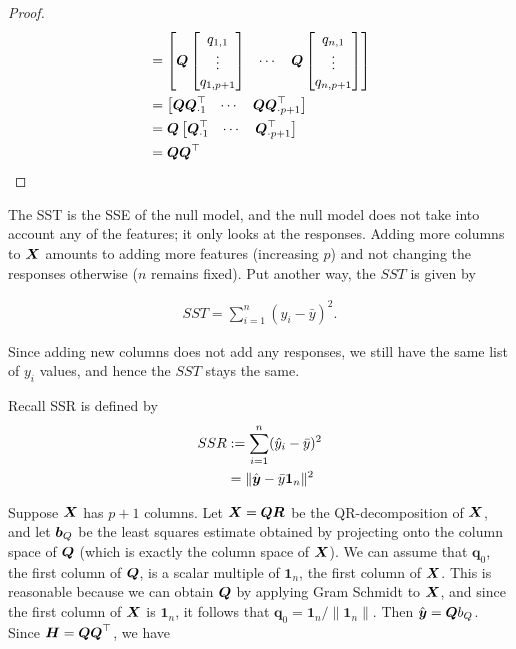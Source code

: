 \documentclass[12pt]{article}
\begin{document}
\begin{enumerate}
\begin{proof}
\begin{align*}
		&=\begin{bmatrix}
			\boldsymbol{Q} \begin{bmatrix}
				q_{1,1}\\
				\vdots\\
				q_{1,p+1}
			\end{bmatrix}
			& \cdots&
			\boldsymbol{Q} \begin{bmatrix}
				q_{n,1}\\
				\vdots\\
				q_{n,p+1}
			\end{bmatrix}
		\end{bmatrix}\\
		&=\begin{bmatrix}
			\boldsymbol{Q} \boldsymbol{Q}^\top_{\cdot 1} & \cdots & \boldsymbol{Q} \boldsymbol{Q}^\top_{\cdot p+1}\\
		\end{bmatrix}\\
		&=\boldsymbol{Q} \begin{bmatrix}
			\boldsymbol{Q}^\top_{\cdot 1} & \cdots & \boldsymbol{Q}^\top_{\cdot p+1}
		\end{bmatrix}\\
		&=\boldsymbol{Q} \boldsymbol{Q}^\top
	\end{align*}
\end{proof}


The SST is the SSE of the null model, and the null model does not take into account
any of the features; it only looks at the responses. Adding more columns to $\boldsymbol{X}$ amounts
to adding more features (increasing $p$) and not changing the responses otherwise
($n$ remains fixed). Put another way, the $SST$ is given by

\begin{align*}
	SST = \sum_{i=1}^{n}(y_i-\bar{y})^2.
\end{align*}

Since adding new columns does not add any responses, we still have the same
list of $y_i$ values, and hence the $SST$ stays the same.


Recall SSR is defined by
\begin{align*}
	SSR
	&:= \sum_{i=1}^{n}(\hat{y}_i-\bar{y})^2\\
	&=\|\hat{\boldsymbol{y}}-\bar{y}\mathbf{1}_n\|^2
\end{align*}

Suppose $\boldsymbol{X}$ has $p+1$ columns. Let $\boldsymbol{X}=\boldsymbol{Q}\boldsymbol{R}$ be the QR-decomposition of $\boldsymbol{X}$,
and let $\boldsymbol{b}_Q$ be the least squares estimate obtained by projecting onto the
column space of $\boldsymbol{Q}$ (which is exactly the column space of $\boldsymbol{X}$). We can
assume that $\mathbf{q}_0$, the first column of $\boldsymbol{Q}$, is a scalar multiple of
$\mathbf{1}_n$, the first column of $\boldsymbol{X}$. This is reasonable because we can obtain
$\boldsymbol{Q}$ by applying Gram Schmidt to $\boldsymbol{X}$, and since the first column of $\boldsymbol{X}$ is
$\mathbf{1}_n$, it follows that $\mathbf{q}_0=\mathbf{1}_n/\|\mathbf{1}_n\|$.
Then $\hat{\boldsymbol{y}}=\boldsymbol{Q} b_Q$. Since $\boldsymbol{H}=\boldsymbol{Q}\boldsymbol{Q}^\top$, we have


\end{enumerate}
\end{document}
